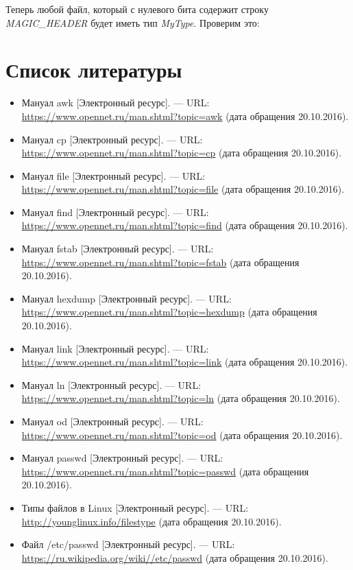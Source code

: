 \documentclass[14pt,a4paper,report]{report}
\begin{document}
Теперь любой файл, который с нулевого бита содержит строку \emph{MAGIC\_HEADER} будет иметь тип \emph{MyType}. Проверим это:



\clearpage

\section{Список литературы}

\begin{itemize}
	\item Мануал awk [Электронный ресурс]. — URL: \href{https://www.opennet.ru/man.shtml?topic=awk}{https://www.opennet.ru/man.shtml?topic=awk} (дата обращения 20.10.2016).
	\item Мануал cp [Электронный ресурс]. — URL: \href{https://www.opennet.ru/man.shtml?topic=cp}{https://www.opennet.ru/man.shtml?topic=cp} (дата обращения 20.10.2016).
	\item Мануал file [Электронный ресурс]. — URL: \href{https://www.opennet.ru/man.shtml?topic=file}{https://www.opennet.ru/man.shtml?topic=file} (дата обращения 20.10.2016).
	\item Мануал find [Электронный ресурс]. — URL: \href{https://www.opennet.ru/man.shtml?topic=find}{https://www.opennet.ru/man.shtml?topic=find} (дата обращения 20.10.2016).
	\item Мануал fstab [Электронный ресурс]. — URL: \href{https://www.opennet.ru/man.shtml?topic=fstab1}{https://www.opennet.ru/man.shtml?topic=fstab} (дата обращения 20.10.2016).
	\item Мануал hexdump [Электронный ресурс]. — URL: \href{https://www.opennet.ru/man.shtml?topic=hexdump}{https://www.opennet.ru/man.shtml?topic=hexdump} (дата обращения 20.10.2016).
	\item Мануал link [Электронный ресурс]. — URL: \href{https://www.opennet.ru/man.shtml?topic=link}{https://www.opennet.ru/man.shtml?topic=link} (дата обращения 20.10.2016).
	\item Мануал ln [Электронный ресурс]. — URL: \href{https://www.opennet.ru/man.shtml?topic=ln}{https://www.opennet.ru/man.shtml?topic=ln} (дата обращения 20.10.2016).
	\item Мануал od [Электронный ресурс]. — URL: \href{https://www.opennet.ru/man.shtml?topic=od}{https://www.opennet.ru/man.shtml?topic=od} (дата обращения 20.10.2016).
	\item Мануал passwd [Электронный ресурс]. — URL: \href{https://www.opennet.ru/man.shtml?topic=passwd}{https://www.opennet.ru/man.shtml?topic=passwd} (дата обращения 20.10.2016).
	\item Типы файлов в Linux [Электронный ресурс]. — URL: \href{http://younglinux.info/filestype} {http://younglinux.info/filestype} (дата обращения 20.10.2016).
	\item Файл /etc/passwd [Электронный ресурс]. — URL: \href{https://ru.wikipedia.org/wiki//etc/passwd} {https://ru.wikipedia.org/wiki//etc/passwd} (дата обращения 20.10.2016).
\end{itemize}
\end{document}
